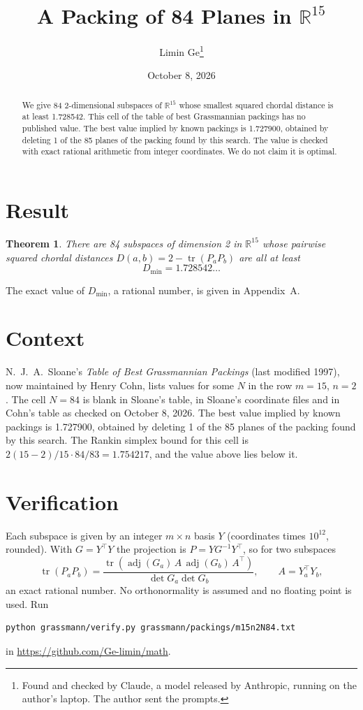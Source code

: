 \documentclass[11pt,a4paper]{article}
\title{A Packing of 84 Planes in $\mathbb{R}^{15}$}
\author{Limin Ge\thanks{Found and checked by Claude, a model released by Anthropic, running on the author's laptop. The author sent the prompts.}}
\date{October 8, 2026}
\newtheorem*{theorem}{Theorem}
\begin{document}
\maketitle
\begin{abstract}
We give 84 2-dimensional subspaces of $\mathbb{R}^{15}$ whose smallest squared chordal distance is at least 1.728542. This cell of the table of best Grassmannian packings has no published value. The best value implied by known packings is 1.727900, obtained by deleting 1 of the 85 planes of the packing found by this search. The value is checked with exact rational arithmetic from integer coordinates. We do not claim it is optimal.
\end{abstract}

\section{Result}
\begin{theorem}
There are 84 subspaces of dimension 2 in $\mathbb{R}^{15}$ whose pairwise squared chordal distances $D(a,b) = 2 - \operatorname{tr}(P_aP_b)$ are all at least
\[ D_{\min} = 1.728542\ldots \]
\end{theorem}
The exact value of $D_{\min}$, a rational number, is given in Appendix~A.


\section{Context}
N.~J.~A.~Sloane's \emph{Table of Best Grassmannian Packings} (last modified 1997), now maintained by Henry Cohn, lists values for some $N$ in the row $m=15$, $n=2$. The cell $N=84$ is blank in Sloane's table, in Sloane's coordinate files and in Cohn's table as checked on October 8, 2026. The best value implied by known packings is 1.727900, obtained by deleting 1 of the 85 planes of the packing found by this search. The Rankin simplex bound for this cell is $2(15-2)/15\cdot 84/83 = 1.754217$, and the value above lies below it.


\section{Verification}
Each subspace is given by an integer $m\times n$ basis $Y$ (coordinates times $10^{12}$, rounded). With $G=Y^\top Y$ the projection is $P=YG^{-1}Y^\top$, so for two subspaces
\[ \operatorname{tr}(P_aP_b)=\frac{\operatorname{tr}(\operatorname{adj}(G_a)\,A\,\operatorname{adj}(G_b)\,A^\top)}{\det G_a\det G_b},\qquad A=Y_a^\top Y_b, \]
an exact rational number. No orthonormality is assumed and no floating point is used. Run
\begin{verbatim}
python grassmann/verify.py grassmann/packings/m15n2N84.txt
\end{verbatim}
in \url{https://github.com/Ge-limin/math}.
\end{document}
